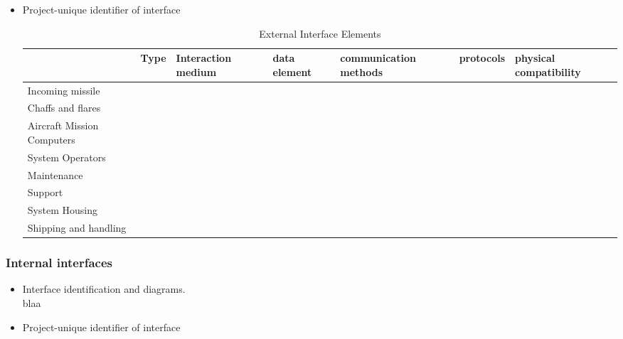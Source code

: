 \begin{itemize}
\item {Project-unique identifier of interface}\\
\begin{table}
\begin{tabular}{ l l l l l l l }
\hline
&Type&Interaction medium&data element&communication methods&protocols&physical compatibility\\
\hline
Incoming missile&&&&&&\\
\hline
Chaffs and flares&&&&&&\\
\hline
Aircraft Mission Computers&&&&&&\\
\hline
System Operators&&&&&&\\
\hline
Maintenance&&&&&&\\
\hline
Support&&&&&&\\
\hline
System Housing&&&&&&\\
\hline
Shipping and handling&&&&&&\\
\hline
\end{tabular}
\caption{External Interface Elements}
\end{table}
\end{itemize}


\subsubsection{Internal interfaces}
\begin{itemize}
\item{Interface identification and diagrams.}\\
blaa
\item{Project-unique identifier of interface}\\

\end{itemize}
